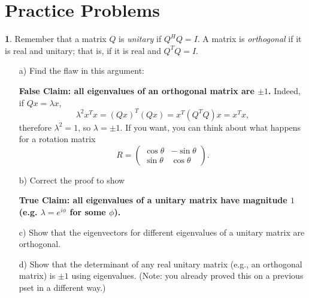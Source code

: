 \documentclass{article}
\theoremstyle{definition}
\newtheorem{prob}{}
\begin{document}
\section*{Practice Problems}
\begin{prob} Remember that a matrix $Q$ is \emph{unitary} if $Q^HQ = I$. A matrix is \emph{orthogonal} if it is real and unitary; that is, if it is real and $Q^TQ=I$.
\begin{itemize}
	\item[a)] Find the flaw in this argument:
	
	 \textbf{False Claim: all eigenvalues of an orthogonal matrix are $\pm 1$.}  Indeed, if $Qx = \lambda x$,
	\[\lambda^2 x^T x = (Qx)^T (Qx) = x^T (Q^T Q) x = x^Tx, \]
	therefore $\lambda^2 = 1$, so $\lambda = \pm 1$.  If you want, you can think about what happens for a rotation matrix
	\[ R = \begin{pmatrix} \cos \theta & -\sin \theta \\ \sin \theta & \cos \theta \end{pmatrix}.\]
	
	\item[b)] Correct the proof to show 
	
	\textbf{True Claim: all eigenvalues of a unitary matrix have magnitude $1$ (e.g. $\lambda = e^{i \phi}$ for some $\phi$).}
	
	\item[c)] Show that the eigenvectors for different eigenvalues of a unitary matrix are orthogonal.
	
	\item[d)] Show that the determinant of any real unitary matrix (e.g., an orthogonal matrix) is $\pm 1$ using eigenvalues.  (Note: you already proved this on a previous pset in a different way.)
	
\end{itemize}
\end{prob}
\end{document}
